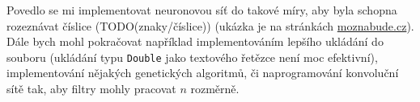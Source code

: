 \documentclass[12pt]{report}			%
\begin{document}
		Povedlo se mi implementovat neuronovou síť do takové míry, aby byla schopna rozeznávat číslice (TODO(znaky/číslice)) (ukázka je na stránkách \url{moznabude.cz}). Dále bych mohl pokračovat například implementováním lepšího ukládání do souboru (ukládání typu \verb!Double! jako textového řetězce není moc efektivní), implementování nějakých genetických algoritmů, či naprogramování konvoluční sítě tak, aby filtry mohly pracovat $n$ rozměrně.
	
	\nocite{*}
    \printglossary[title={Slovníček pojmů}]	%
    \printbibliography					%
    \listoffigures						%
    
    \begin{prilohy}
    \end{prilohy}
\end{document}

